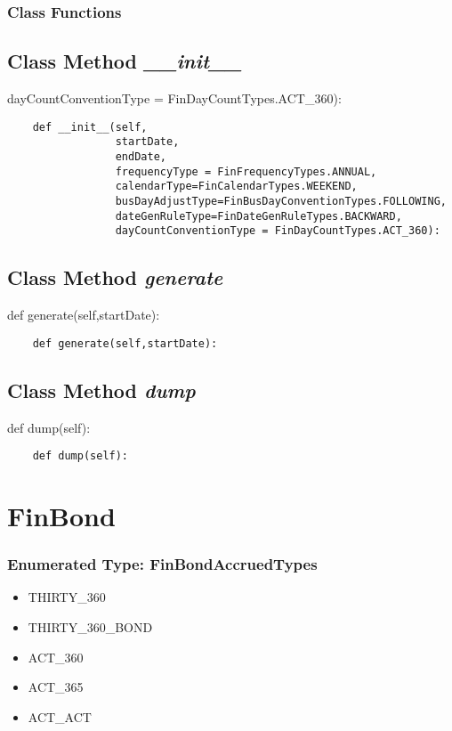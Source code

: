 \documentclass[twoside,11pt]{book}
\begin{document}
\subsubsection{Class Functions}

\subsection{Class Method {\it \_\_init\_\_}}
dayCountConventionType = FinDayCountTypes.ACT\_360):

\begin{lstlisting}
    def __init__(self,
                 startDate,
                 endDate,
                 frequencyType = FinFrequencyTypes.ANNUAL,
                 calendarType=FinCalendarTypes.WEEKEND,
                 busDayAdjustType=FinBusDayConventionTypes.FOLLOWING,
                 dateGenRuleType=FinDateGenRuleTypes.BACKWARD, 
                 dayCountConventionType = FinDayCountTypes.ACT_360):
\end{lstlisting}

\subsection{Class Method {\it generate}}
def generate(self,startDate):

\begin{lstlisting}
    def generate(self,startDate):
\end{lstlisting}

\subsection{Class Method {\it dump}}
def dump(self):

\begin{lstlisting}
    def dump(self):
\end{lstlisting}

\newpage
\section{FinBond}

\subsubsection{Enumerated Type: FinBondAccruedTypes}
\begin{itemize}
\item{THIRTY\_360}
\item{THIRTY\_360\_BOND}
\item{ACT\_360}
\item{ACT\_365}
\item{ACT\_ACT}
\end{itemize}
\end{document}
